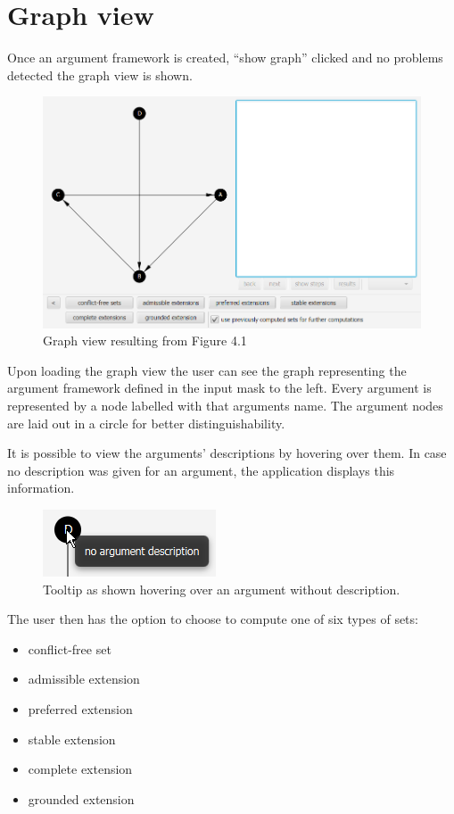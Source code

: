 \documentclass[draft,final]{vutinfth} %
\newcommand{\hl}{\par\vspace{6pt}} %
\begin{document}
\section{Graph view}
Once an argument framework is created, ``show graph'' clicked and no problems detected the graph view is shown.

\FloatBarrier
	\begin{figure}[!h]
		\centering
		\includegraphics[width=\linewidth]{pics/demo.png}
		\caption{Graph view resulting from Figure 4.1}
	\end{figure}
\FloatBarrier

Upon loading the graph view the user can see the graph representing the argument framework defined in the input mask to the left. Every argument is represented by a node labelled with that arguments name. The argument nodes are laid out in a circle for better distinguishability.\hl
It is possible to view the arguments' descriptions by hovering over them. In case no description was given for an argument, the application displays this information.\hl

\FloatBarrier
	\begin{figure}[!h]
		\centering
		\includegraphics[scale=2]{pics/argdes.png}
		\caption{Tooltip as shown hovering over an argument without description.}
	\end{figure}
\FloatBarrier

The user then has the option to choose to compute one of six types of sets:

\begin{itemize}[noitemsep]
	\item conflict-free set
	\item admissible extension
	\item preferred extension
	\item stable extension
	\item complete extension
	\item grounded extension
\end{itemize}
\end{document}
